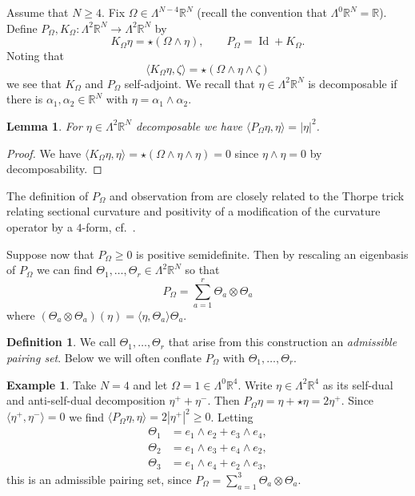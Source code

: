 \documentclass[11pt]{amsart}
\numberwithin{equation}{section}
\theoremstyle{plain}
\newtheorem{lemma}[lemma]{Lemma}
\theoremstyle{definition}
\newtheorem{definition}[definition]{Definition}
\newtheorem{example}[example]{Example}
\theoremstyle{remark}
\newcommand{\R}{\mathbb{R}}
\DeclareMathOperator{\Id}{Id}
\newcommand{\bangle}[1]{\langle #1 \rangle}
\begin{document}
Assume that $N \geq 4$. Fix $\Omega \in \Lambda^{N-4}\R^N$ (recall the convention that $\Lambda^0\R^N = \R$). Define $P_\Omega, K_\Omega : \Lambda^2\R^N\to\Lambda^2\R^N$ by
\[
K_\Omega \eta = \star (\Omega\wedge \eta), \qquad P_\Omega = \Id + K_\Omega. 
\]
Noting that 
\begin{equation}\label{eq:K_omega-pairing}
\bangle{K_\Omega \eta,\zeta} = \star (\Omega \wedge \eta\wedge \zeta)
\end{equation}
 we see that $K_\Omega$ and $P_\Omega$ self-adjoint. We recall that $\eta \in \Lambda^2 \R^N$ is decomposable if there is $\alpha_1,\alpha_2 \in \R^N$ with $\eta = \alpha_1\wedge \alpha_2$. 
\begin{lemma}\label{lemm:P-decomp}
For $\eta \in \Lambda^2\R^N$ decomposable we have $\bangle{P_\Omega \eta,\eta} = |\eta|^2$. 
\end{lemma}
\begin{proof}
We have $\bangle{K_\Omega \eta,\eta} = \star (\Omega\wedge \eta\wedge\eta) = 0$ since $\eta\wedge \eta =0$ by decomposability. 
\end{proof}
The definition of $P_\Omega$ and observation from  are closely related to the Thorpe trick relating sectional curvature and positivity of a modification of the curvature operator by a $4$-form, cf.\ \cite{Finsler,Thorpe:curvuturePOS4mfld,Thorpe:zeroes,Thorpe:zeroes-erratum,BettiolMendes:nonneg,BettiolMendes:strongly-pos-curv,BKM}. 


Suppose now that $P_\Omega \geq 0$ is positive semidefinite. Then by rescaling an eigenbasis of $P_\Omega$ we can find $\Theta_1,\dots,\Theta_r \in \Lambda^2\R^N$ so that
\[
P_\Omega = \sum_{a=1}^r \Theta_a\otimes\Theta_a
\]
where $(\Theta_a \otimes \Theta_a)(\eta) = \bangle{\eta,\Theta_a}\Theta_a$. 

\begin{definition}\label{defi:adm-pairing-set}
We call $\Theta_1,\dots,\Theta_r$ that arise from this construction an \emph{admissible pairing set}. Below we will often conflate $P_\Omega$ with $\Theta_1,\dots,\Theta_r$. 
\end{definition}

\begin{example}
Take $N = 4$ and let $\Omega = 1 \in \Lambda^0\R^4$. Write $\eta \in \Lambda^2\R^4$ as its self-dual and anti-self-dual decomposition $\eta^++\eta^-$. Then $P_\Omega \eta = \eta + \star \eta = 2 \eta^+$. Since $\bangle{\eta^+,\eta^-} = 0$ we find $\bangle{P_\Omega \eta,\eta} = 2|\eta^+|^2 \geq 0$. Letting
\begin{align*}
\Theta_1 &= e_1\wedge e_2 + e_3\wedge e_4,\\
\Theta_2 & = e_1\wedge e_3 + e_4\wedge e_2,\\
\Theta_3 &= e_1\wedge e_4 + e_2\wedge e_3,
\end{align*}
this is an admissible pairing set, since $P_\Omega = \sum_{a=1}^3 \Theta_a \otimes \Theta_a$. 
\end{example}
\end{document}
